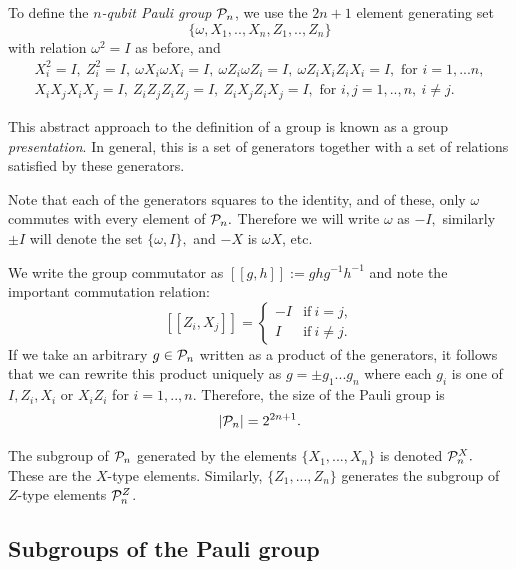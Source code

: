 To define
the {\it $n$-qubit Pauli group} $\mathcal{P}_n$, 
we use the $2n+1$ element 
generating set 
$$\{\omega , X_1, .., X_n, Z_1, .., Z_n\}$$
with relation $\omega^2=I$ as before, and
\begin{equation}\label{presentation}
\begin{array}{c}
X_i^2=I,\ Z_i^2=I,\ \omega X_i\omega X_i=I,\ \omega Z_i\omega Z_i=I,\ \omega Z_iX_iZ_iX_i=I, 
\mbox{\ for\ } i=1,...n,\\
X_iX_jX_iX_j=I,\ 
Z_iZ_jZ_iZ_j=I,\ 
Z_iX_jZ_iX_j=I, \mbox{\ for\ } i, j = 1,..,n,\ i\ne j.
\end{array}
\end{equation}

This abstract approach to the definition of a group is known as
a group \emph{presentation}. In general, this is a set of
generators together with a set of relations satisfied
by these generators.

Note that each of the generators squares to the identity,
and of these, only $\omega$ commutes with every element of $\mathcal{P}_n.$
Therefore we will write $\omega$ as $-I,$
similarly $\pm I$ will denote the
set $\{\omega, I\},$ and $-X$ is $\omega X$, etc.

We write the group commutator as
$[[g, h]]:=ghg^{-1}h^{-1}$
and note the important commutation relation:
$$
    [[Z_i, X_j]] = 
    \left\{ \begin{array}{ll}
 -I &\mbox{if}\ i=j,\\
 I &\mbox{if}\ i\ne j.\end{array}\right.
$$
If we take an arbitrary $g\in \mathcal{P}_n$
written as a product of the generators,
it follows that we can rewrite this
product uniquely as %
$ g = \pm g_1 ... g_n $
where each $g_i$ is one of $I, Z_i, X_i$ or $X_i Z_i$
for $i=1,..,n.$
Therefore, the size of the
Pauli group is 
$$
    |\mathcal{P}_n| = 2^{2n+1}.
$$

The subgroup of $\mathcal{P}_n$ generated by
the elements $\{X_1,...,X_n\}$ %
is denoted $\mathcal{P}_n^X.$ These are the $X$-type
elements. Similarly,
 $\{Z_1,...,Z_n\}$ generates %
the subgroup of $Z$-type elements $\mathcal{P}_n^Z$.

\subsection{Subgroups of the Pauli group}

